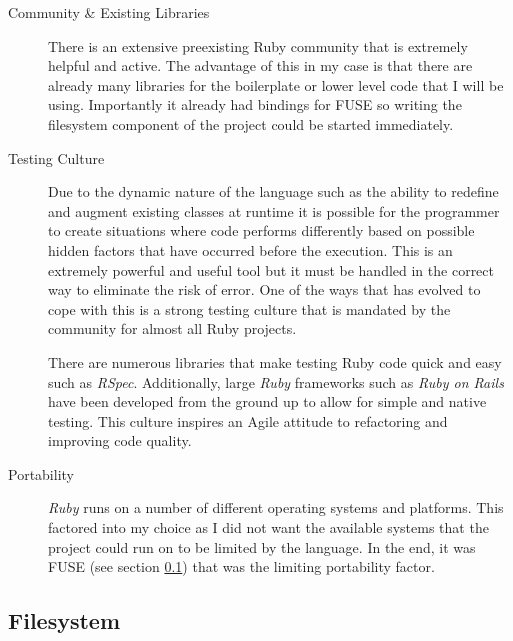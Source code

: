 \begin{description}

  \item[Community \& Existing Libraries] \hfill

    There is an extensive preexisting Ruby community that is extremely helpful
    and active. The advantage of this in my case is that there are already many
    libraries for the boilerplate or lower level code that I will be using.
    Importantly it already had bindings for \ac{FUSE} so writing the filesystem
    component of the project could be started immediately.

  \item[Testing Culture] \hfill

    Due to the dynamic nature of the language such as the ability to redefine
    and augment existing classes at runtime it is possible for the programmer
    to create situations where code performs differently based on possible
    hidden factors that have occurred before the execution. This is an
    extremely powerful and useful tool but it must be handled in the correct
    way to eliminate the risk of error. One of the ways that has evolved to
    cope with this is a strong testing culture that is mandated by the
    community for almost all Ruby projects.

    There are numerous libraries that make testing Ruby code quick and easy
    such as \emph{RSpec}. Additionally, large \emph{Ruby} frameworks such as
    \emph{Ruby on Rails} have been developed from the ground up to allow for
    simple and native testing. This culture inspires an Agile attitude to
    refactoring and improving code quality.

  \item[Portability] \hfill

    \emph{Ruby} runs on a number of different operating systems and platforms.
    This factored into my choice as I did not want the available systems that
    the project could run on to be limited by the language. In the end, it was
    \ac{FUSE} (see section \ref{ssec:filesystem}) that was the limiting
    portability factor.

\end{description}


\subsection{Filesystem}
\label{ssec:filesystem}

